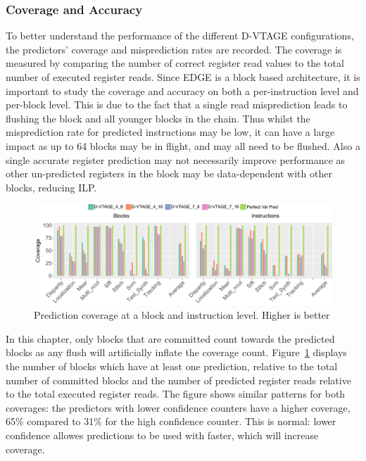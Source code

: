 \subsubsection{Coverage and Accuracy}
To better understand the performance of the different D-VTAGE configurations, the predictors' coverage and misprediction rates are recorded.
The coverage is measured by comparing the number of correct register read values to the total number of executed register reads.
Since EDGE is a block based architecture, it is important to study the coverage and accuracy on both a per-instruction level and per-block level.
This is due to the fact that a single read misprediction leads to flushing the block and all younger blocks in the chain.
Thus whilst the misprediction rate for predicted instructions may be low, it can have a large impact as up to 64 blocks may be in flight, and may all need to be flushed.
Also a single accurate register prediction may not necessarily improve performance as other un-predicted registers in the block may be data-dependent with other blocks, reducing ILP.

\begin{figure}[t]
    \centering
    \includegraphics[width=1\textwidth]{chapter3/graphics/coverageFull.pdf}
    \caption{Prediction coverage at a block and instruction level. Higher is better}
    \label{fig:vtag_cov_block}
	\vspace{1em}
\end{figure}

In this chapter, only blocks that are committed count towards the predicted blocks as any flush will artificially inflate the coverage count.
Figure~\ref{fig:vtag_cov_block} displays the number of blocks which have at least one prediction, relative to the total number of committed blocks and the number of predicted register reads relative to the total executed register reads.
The figure shows similar patterns for both coverages: the predictors with lower confidence counters have a higher coverage, 65\% compared to 31\% for the high confidence counter.
This is normal: lower confidence allowes predictions to be used with faster, which will increase coverage.

